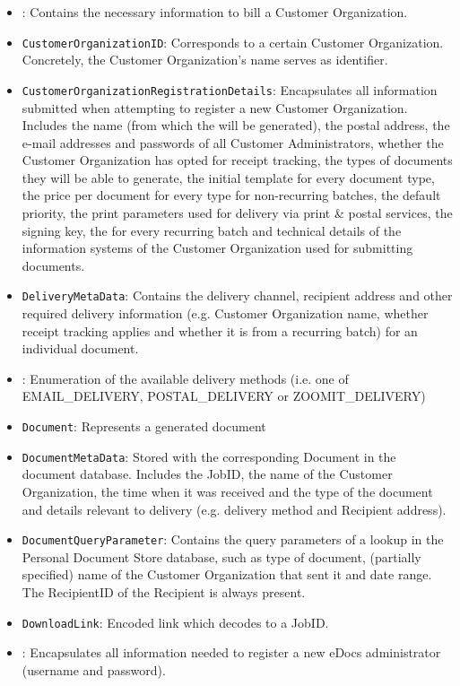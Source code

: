 \begin{itemize}
	\item {}: Contains the necessary information to bill a Customer Organization.
	\item \texttt{CustomerOrganizationID}: Corresponds to a certain Customer Organization. Concretely, the Customer Organization's name serves as identifier.
	\item \texttt{CustomerOrganizationRegistrationDetails}: Encapsulates all information submitted when attempting to register a new Customer Organization. Includes the name (from which the  will be generated), the postal address, the e-mail addresses and passwords of all Customer Administrators, whether the Customer Organization has opted for receipt tracking, the types of documents they will be able to generate, the initial template for every document type, the price per document for every type for non-recurring batches, the default priority, the print parameters used for delivery via print \& postal services, the signing key, the  for every recurring batch and technical details of the information systems of the Customer Organization used for submitting documents.
	\item \texttt{DeliveryMetaData}: Contains the delivery channel, recipient address and other required delivery information (e.g. Customer Organization name, whether receipt tracking applies and whether it is from a recurring batch) for an individual document.
	\item {}: Enumeration of the available delivery methods (i.e. one of EMAIL\_DELIVERY, POSTAL\_DELIVERY or ZOOMIT\_DELIVERY)
	\item \texttt{Document}: Represents a generated document
	\item \texttt{DocumentMetaData}: Stored with the corresponding Document in the document database. Includes the JobID, the name of the Customer Organization, the time when it was received and the type of the document and details relevant to delivery (e.g. delivery method and Recipient address).
	\item \texttt{DocumentQueryParameter}: Contains the query parameters of a lookup in the Personal Document Store database, such as type of document, (partially specified) name of the Customer Organization that sent it and date range. The RecipientID of the Recipient is always present.
	\item \texttt{DownloadLink}: Encoded link which decodes to a JobID.
	\item {}: Encapsulates all information needed to register a new eDocs administrator (username and password).

\end{itemize}
